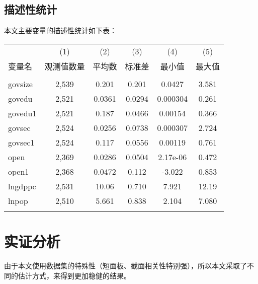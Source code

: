 \documentclass[10pt]{article}
\begin{document}
\subsection{描述性统计}
本文主要变量的描述性统计如下表：
\begin{center}
    \begin{tabular}{lccccc} \hline
         & (1) & (2) & (3) & (4) & (5) \\
        变量名 & 观测值数量 & 平均数 & 标准差 & 最小值 & 最大值 \\ \hline
         &  &  &  &  &  \\
        govsize & 2,539 & 0.201 & 0.201 & 0.0427 & 3.581 \\
        govedu & 2,521 & 0.0361 & 0.0294 & 0.000304 & 0.261 \\
        govedu1 & 2,521 & 0.187 & 0.0466 & 0.00154 & 0.366 \\
        govsec & 2,524 & 0.0256 & 0.0738 & 0.000307 & 2.724 \\
        govsec1 & 2,524 & 0.117 & 0.0556 & 0.00119 & 0.761 \\
        open & 2,369 & 0.0286 & 0.0504 & 2.17e-06 & 0.472 \\
        open1 & 2,368 & 0.0472 & 0.112 & -3.022 & 0.853 \\
        lngdppc & 2,531 & 10.06 & 0.710 & 7.921 & 12.19 \\
        lnpop & 2,510 & 5.661 & 0.838 & 2.104 & 7.080 \\
         &  &  &  &  &  \\ \hline
    \end{tabular}

    \end{center}


\section{实证分析}
由于本文使用数据集的特殊性（短面板、截面相关性特别强），所以本文采取了不同的估计方式，来得到更加稳健的结果。
\end{document}
